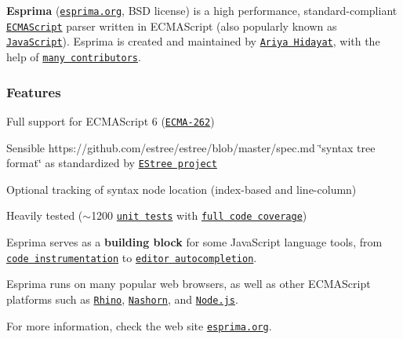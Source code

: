 {\bfseries Esprima} (\href{http://esprima.org}{\tt esprima.\+org}, B\+S\+D license) is a high performance, standard-\/compliant \href{http://www.ecma-international.org/publications/standards/Ecma-262.htm}{\tt E\+C\+M\+A\+Script} parser written in E\+C\+M\+A\+Script (also popularly known as \href{https://en.wikipedia.org/wiki/JavaScript}{\tt Java\+Script}). Esprima is created and maintained by \href{https://twitter.com/ariyahidayat}{\tt Ariya Hidayat}, with the help of \href{https://github.com/jquery/esprima/contributors}{\tt many contributors}.

\subsubsection*{Features}


\begin{DoxyItemize}
\item Full support for E\+C\+M\+A\+Script 6 (\href{http://www.ecma-international.org/publications/standards/Ecma-262.htm}{\tt E\+C\+M\+A-\/262})
\item Sensible https\+://github.com/estree/estree/blob/master/spec.\+md \char`\"{}syntax tree format\char`\"{} as standardized by \href{https://github.com/estree/estree}{\tt E\+Stree project}
\item Optional tracking of syntax node location (index-\/based and line-\/column)
\item Heavily tested ($\sim$1200 \href{https://github.com/jquery/esprima/tree/master/test/fixtures}{\tt unit tests} with \href{https://travis-ci.org/jquery/esprima}{\tt full code coverage})
\end{DoxyItemize}

Esprima serves as a {\bfseries building block} for some Java\+Script language tools, from \href{http://esprima.org/demo/functiontrace.html}{\tt code instrumentation} to \href{http://esprima.org/demo/autocomplete.html}{\tt editor autocompletion}.

Esprima runs on many popular web browsers, as well as other E\+C\+M\+A\+Script platforms such as \href{http://www.mozilla.org/rhino}{\tt Rhino}, \href{http://openjdk.java.net/projects/nashorn/}{\tt Nashorn}, and \href{https://npmjs.org/package/esprima}{\tt Node.\+js}.

For more information, check the web site \href{http://esprima.org}{\tt esprima.\+org}. 